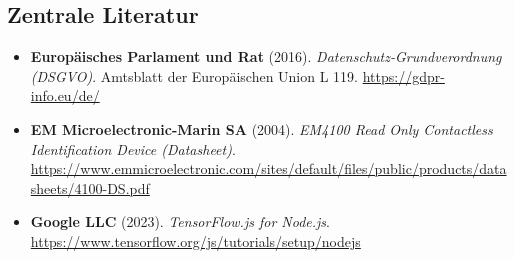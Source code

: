 \vspace{1em}
\subsection*{Zentrale Literatur}
\begin{itemize}[leftmargin=*]
    \small
    \item \textbf{Europäisches Parlament und Rat} (2016). \textit{Datenschutz-Grundverordnung (DSGVO)}. Amtsblatt der Europäischen Union L 119. \url{https://gdpr-info.eu/de/}
    \item \textbf{EM Microelectronic-Marin SA} (2004). \textit{EM4100 Read Only Contactless Identification Device (Datasheet)}. \url{https://www.emmicroelectronic.com/sites/default/files/public/products/datasheets/4100-DS.pdf}
    \item \textbf{Google LLC} (2023). \textit{TensorFlow.js for Node.js}. \url{https://www.tensorflow.org/js/tutorials/setup/nodejs}
\end{itemize}
